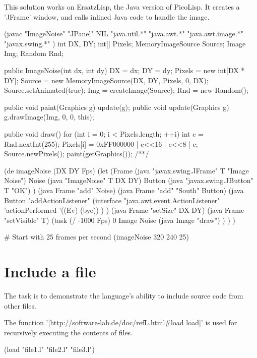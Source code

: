 \begin{wideverbatim}

This solution works on ErsatzLisp, the Java version of PicoLisp. It creates a
'JFrame' window, and calls inlined Java code to handle the image.

(javac "ImageNoise" "JPanel" NIL
      "java.util.*"
      "java.awt.*" "java.awt.image.*" "javax.swing.*" )
   int DX, DY;
   int[] Pixels;
   MemoryImageSource Source;
   Image Img;
   Random Rnd;

   public ImageNoise(int dx, int dy) {
      DX = dx;
      DY = dy;
      Pixels = new int[DX * DY];
      Source = new MemoryImageSource(DX, DY, Pixels, 0, DX);
      Source.setAnimated(true);
      Img = createImage(Source);
      Rnd = new Random();
   }

   public void paint(Graphics g) {update(g);}
   public void update(Graphics g) {g.drawImage(Img, 0, 0, this);}

   public void draw() {
      for (int i = 0; i < Pixels.length; ++i) {
         int c = Rnd.nextInt(255);
         Pixels[i] = 0xFF000000 | c<<16 | c<<8 | c;
      }
      Source.newPixels();
      paint(getGraphics());
   }
/**/

(de imageNoise (DX DY Fps)
   (let
      (Frame (java "javax.swing.JFrame" T "Image Noise")
         Noise (java "ImageNoise" T DX DY)
         Button (java "javax.swing.JButton" T "OK") )
      (java Frame "add" Noise)
      (java Frame "add" "South" Button)
      (java Button "addActionListener"
         (interface "java.awt.event.ActionListener"
            'actionPerformed '((Ev) (bye)) ) )
      (java Frame "setSize" DX DY)
      (java Frame "setVisible" T)
      (task (/ -1000 Fps) 0
         Image Noise
         (java Image "draw") ) ) )

# Start with 25 frames per second
(imageNoise 320 240 25)

\end{wideverbatim}

\pagebreak{}
\section*{Include a file}

The task is to demonstrate the language's ability to include source code
from other files.

\begin{wideverbatim}

The function '[http://software-lab.de/doc/refL.html#load load]' is used for
recursively executing the contents of files.

(load "file1.l" "file2.l" "file3.l")

\end{wideverbatim}

